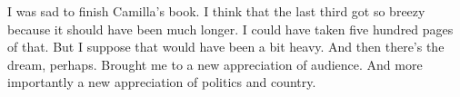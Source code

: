 

I was sad to finish Camilla's book.  I think that the last third got
so breezy because it should have been much longer.  I could have taken
five hundred pages of that.  But I suppose that would have been a bit
heavy.  And then there's the dream, perhaps.  Brought me to a new
appreciation of audience.  And more importantly a new appreciation of
politics and country.

\bye
